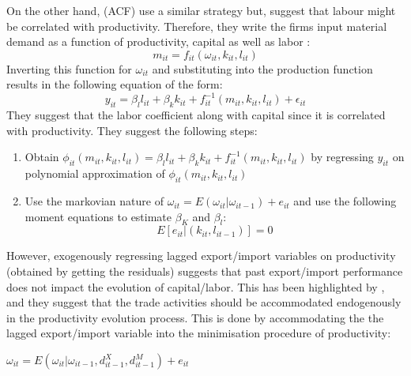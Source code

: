 \documentclass[11pt]{article}
\begin{document}
On the other hand, \textcite{ackerberg2006structural}(ACF) use a
similar strategy but, suggest that labour might be
correlated with productivity. Therefore, they write  the firms input
material demand as a function of productivity, capital as well as
labor : 
$$ m_{it} = f_{it}(\omega_{it}, k_{it}, l_{it})$$
Inverting this function for $\omega_{it}$ and substituting into the
production function results in the following 
equation of the form:
\begin{equation}
y_{it} = \beta_{l}l_{it} + \beta_k k_{it} + f_{it}^{-1}(m_{it},
k_{it}, l_{it})+ \epsilon_{it}
\end{equation}
They suggest that the  labor coefficient along with capital since it is correlated with
productivity. 
They suggest the following steps:
\begin{enumerate}
\item Obtain $\phi_{it}(m_{it}, k_{it}, l_{it}) = \beta_{l}l_{it} + \beta_k k_{it} + f_{it}^{-1}(m_{it},
k_{it}, l_{it})$ by regressing $y_{it}$ on polynomial approximation of
$\phi_{it}(m_{it}, k_{it}, l_{it})$
\item Use the markovian nature of $\omega_{it} =
  E(\omega_{it}|\omega_{it-1}) + e_{it}$
and use the following moment equations to estimate $\beta_{K}$ and
$\beta_{l}$:
\begin{equation}
E[e_{it}|(k_{it}, l_{it-1})]= 0
\end{equation}
\end{enumerate} 

However, exogenously regressing lagged  export/import variables  on
productivity (obtained by getting the residuals) suggests that past
export/import performance does not impact the evolution of
capital/labor. This has been highlighted by \textcite{de2013detecting}, and
they suggest that the trade activities should be accommodated
endogenously in the productivity evolution process. This is done by
accommodating the the lagged export/import variable into the
minimisation procedure of productivity:

$\omega_{it} =
  E(\omega_{it}|\omega_{it-1}, d_{it-1}^{X}, d_{it-1}^{M}) + e_{it}$



\end{document}
